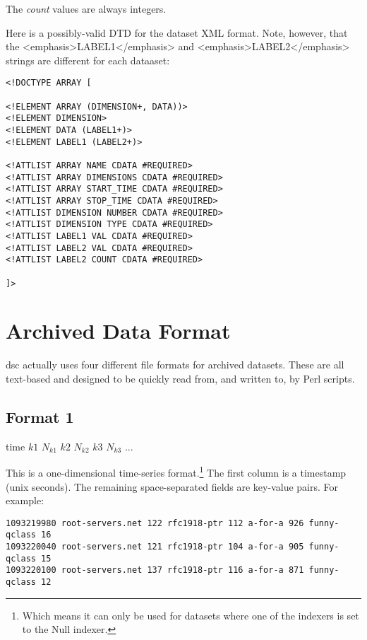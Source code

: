 \documentclass{report}
\def\dsc{{\sc dsc}}
\begin{document}
\noindent
The {\em count\/} values are always integers.

\noindent
Here is a possibly-valid DTD for the dataset XML format.
Note, however, that the <emphasis>LABEL1</emphasis>
and <emphasis>LABEL2</emphasis> strings are different
for each dataaset:

\begin{verbatim}
<!DOCTYPE ARRAY [  

<!ELEMENT ARRAY (DIMENSION+, DATA))>
<!ELEMENT DIMENSION>
<!ELEMENT DATA (LABEL1+)>
<!ELEMENT LABEL1 (LABEL2+)>

<!ATTLIST ARRAY NAME CDATA #REQUIRED>
<!ATTLIST ARRAY DIMENSIONS CDATA #REQUIRED>
<!ATTLIST ARRAY START_TIME CDATA #REQUIRED>
<!ATTLIST ARRAY STOP_TIME CDATA #REQUIRED>
<!ATTLIST DIMENSION NUMBER CDATA #REQUIRED>
<!ATTLIST DIMENSION TYPE CDATA #REQUIRED>
<!ATTLIST LABEL1 VAL CDATA #REQUIRED>
<!ATTLIST LABEL2 VAL CDATA #REQUIRED>
<!ATTLIST LABEL2 COUNT CDATA #REQUIRED>

]> 
\end{verbatim}

\section{Archived Data Format}

{\dsc} actually uses four different file formats for archived
datasets.  These are all text-based and designed to be quickly
read from, and written to, by Perl scripts.  

\subsection{Format 1}

\noindent
\begin{tt}time $k1$ $N_{k1}$ $k2$ $N_{k2}$ $k3$ $N_{k3}$ ...
\end{tt}

\vspace{1ex}\noindent
This is a one-dimensional time-series format.\footnote{Which means
it can only be used for datasets where one of the indexers is set
to the Null indexer.}  The first column is a timestamp (unix seconds).
The remaining space-separated fields are key-value pairs.  For
example:

\begin{footnotesize}\begin{verbatim}
1093219980 root-servers.net 122 rfc1918-ptr 112 a-for-a 926 funny-qclass 16
1093220040 root-servers.net 121 rfc1918-ptr 104 a-for-a 905 funny-qclass 15
1093220100 root-servers.net 137 rfc1918-ptr 116 a-for-a 871 funny-qclass 12
\end{verbatim}\end{footnotesize}
\end{document}
